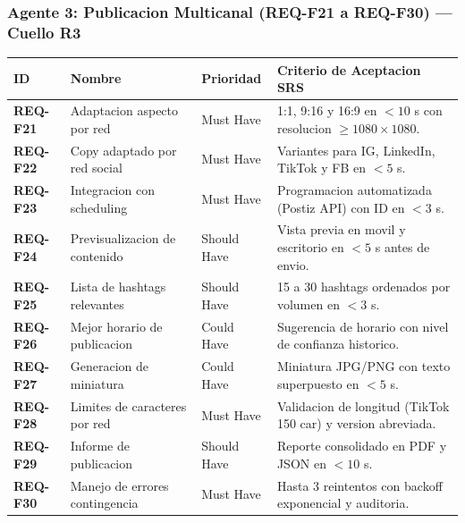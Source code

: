 \documentclass[11pt,a4paper]{article}
\begin{document}
\subsubsection*{Agente 3: Publicacion Multicanal (REQ-F21 a REQ-F30) --- Cuello R3}
\begin{longtable}{p{2.2cm}p{4.5cm}p{2.5cm}p{5.8cm}}
\toprule
ID & Nombre & Prioridad & Criterio de Aceptacion SRS \\
\midrule
\endhead
\bottomrule
\endfoot
\textbf{REQ-F21} & Adaptacion aspecto por red & Must Have & 1:1, 9:16 y 16:9 en $<10$ s con resolucion $\ge 1080\times 1080$. \\
\textbf{REQ-F22} & Copy adaptado por red social & Must Have & Variantes para IG, LinkedIn, TikTok y FB en $<5$ s. \\
\textbf{REQ-F23} & Integracion con scheduling & Must Have & Programacion automatizada (Postiz API) con ID en $<3$ s. \\
\textbf{REQ-F24} & Previsualizacion de contenido & Should Have & Vista previa en movil y escritorio en $<5$ s antes de envio. \\
\textbf{REQ-F25} & Lista de hashtags relevantes & Should Have & 15 a 30 hashtags ordenados por volumen en $<3$ s. \\
\textbf{REQ-F26} & Mejor horario de publicacion & Could Have & Sugerencia de horario con nivel de confianza historico. \\
\textbf{REQ-F27} & Generacion de miniatura & Could Have & Miniatura JPG/PNG con texto superpuesto en $<5$ s. \\
\textbf{REQ-F28} & Limites de caracteres por red & Must Have & Validacion de longitud (TikTok 150 car) y version abreviada. \\
\textbf{REQ-F29} & Informe de publicacion & Should Have & Reporte consolidado en PDF y JSON en $<10$ s. \\
\textbf{REQ-F30} & Manejo de errores contingencia& Must Have & Hasta 3 reintentos con backoff exponencial y auditoria. \\
\end{longtable}
\end{document}
